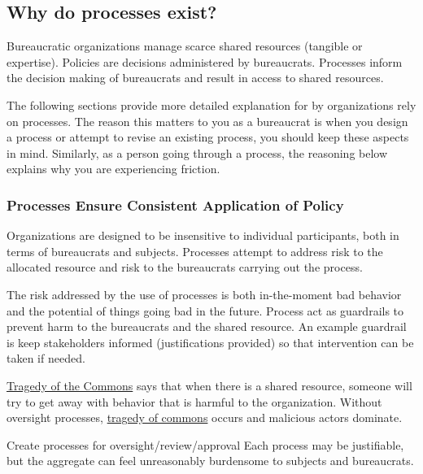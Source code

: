 \subsection{Why do processes exist?}

Bureaucratic organizations manage scarce shared resources (tangible or expertise). Policies are decisions administered by bureaucrats. Processes inform the decision making of bureaucrats and result in access to shared resources. 

The following sections provide more detailed explanation for by organizations rely on processes. The reason this matters to you as a bureaucrat is when you design a process or attempt to revise an existing process, you should keep these aspects in mind. Similarly, as a person going through a process, the reasoning below explains why you are experiencing friction. 

\subsubsection{Processes Ensure Consistent Application of Policy}

Organizations are designed to be insensitive to individual participants, both in terms of bureaucrats and subjects. Processes attempt to address risk to the allocated resource and risk to the bureaucrats carrying out the process.

The risk addressed by the use of processes is both in-the-moment bad behavior and the potential of things going bad in the future. Process act as guardrails to prevent harm to the bureaucrats and the shared resource. An example guardrail is keep stakeholders informed (justifications provided) so that intervention can be taken if needed. 

\href{https://en.wikipedia.org/wiki/Tragedy_of_the_commons}{Tragedy of the Commons} says that when there is a shared resource, someone will try to get away with behavior that is harmful to the organization.
Without oversight processes, \href{https://en.wikipedia.org/wiki/Tragedy_of_the_commons}{tragedy of commons} occurs and malicious actors dominate.


Create processes for oversight/review/approval
Each process may be justifiable, but the aggregate can feel unreasonably burdensome to subjects and bureaucrats.





